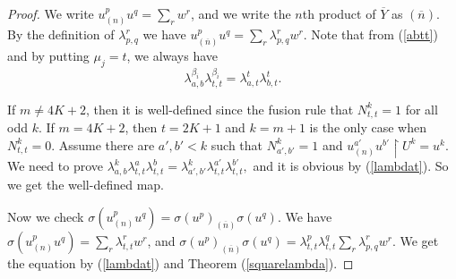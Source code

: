 \documentclass{article}
\begin{document}
\begin{proof}
We write $u^p_{(n)}u^q=\sum_r w^r$,
and we write the $n$th product of $\overline{Y}$ as $(\overline{n})$.
By the definition of $\lambda_{p,q}^r$ we have $u^p_{(\overline{n})}u^q=\sum_r \lambda_{p,q}^r w^r$.
Note that from (\ref{abtt}) and by putting $\mu_j=t$,
we always have 
\begin{equation}\label{lambdat}
\lambda_{a,b}^{\beta_i}\lambda_{t,t}^{\beta_i}=\lambda_{a,t}^{t}\lambda_{b,t}^{t}.
\end{equation}


If $m\neq 4K+2$, then it is well-defined since the fusion rule that $N_{t,t}^k=1$ for all odd $k$.
If $m=4K+2$, then $t=2K+1$ and $k=m+1$ is the only case when $N_{t,t}^k=0$.
Assume there are $a',b'<k$ such that $N_{a',b'}^k=1$ and $u^{a'}_{(n)}u^{b'}\restriction U^k=u^k$.
We need to prove $\lambda_{a,b}^k\lambda_{t,t}^a\lambda_{t,t}^b =\lambda_{a',b'}^k\lambda_{t,t}^{a'}\lambda_{t,t}^{b'},$
and it is obvious by (\ref{lambdat}). So we get the well-defined map.

Now we check $\sigma(u^p_{(n)}u^q)=\sigma(u^p)_{(\overline{n})}\sigma(u^q)$.
We have $\sigma(u^p_{(n)}u^q)=\sum_r \lambda_{t,t}^r w^r$, 
and $\sigma(u^p)_{(\overline{n})}\sigma(u^q)=\lambda_{t,t}^p\lambda_{t,t}^q\sum_r \lambda_{p,q}^r w^r$.
We get the equation by (\ref{lambdat}) and Theorem (\ref{squarelambda}).

\end{proof}
\end{document}

